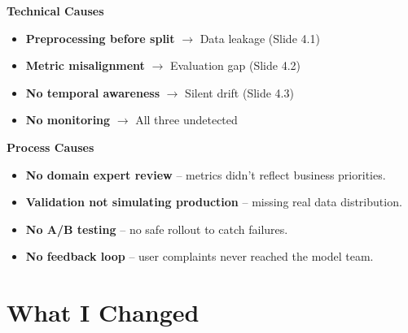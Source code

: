 \documentclass[11pt]{article}
\begin{document}
\begin{minipage}[t]{0.47\textwidth}

{\large\color{brandorange}\textbf{Technical Causes}}

\vspace{0.1in}
\begin{itemize}[leftmargin=*, itemsep=0.15in, label={\color{brandblue}\textbullet}]
    \item \textbf{Preprocessing before split} $\rightarrow$ Data leakage (Slide 4.1)
    \item \textbf{Metric misalignment} $\rightarrow$ Evaluation gap (Slide 4.2)
    \item \textbf{No temporal awareness} $\rightarrow$ Silent drift (Slide 4.3)
    \item \textbf{No monitoring} $\rightarrow$ All three undetected
\end{itemize}

\end{minipage}
\hfill
\begin{minipage}[t]{0.47\textwidth}

{\large\color{brandorange}\textbf{Process Causes}}

\vspace{0.1in}
\begin{itemize}[leftmargin=*, itemsep=0.15in, label={\color{brandblue}\textbullet}]
    \item \textbf{No domain expert review} – metrics didn't reflect business priorities.
    \item \textbf{Validation not simulating production} – missing real data distribution.
    \item \textbf{No A/B testing} – no safe rollout to catch failures.
    \item \textbf{No feedback loop} – user complaints never reached the model team.
\end{itemize}

\end{minipage}

\vfill
\newpage


\section*{What I Changed}

\vspace{0.1in}
\end{document}
